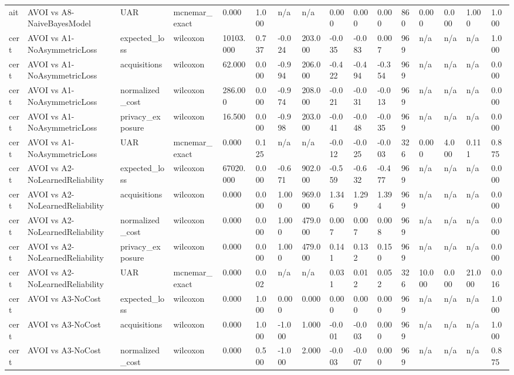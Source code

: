 \begin{table}[!ht]
{\begin{tabular}{llllllllllllllll}
ait & AVOI vs A8-NaiveBayesModel & UAR & mcnemar\_exact & 0.000 & 1.000 & n/a & n/a & 0.000 & 0.000 & 0.000 & 860 & 0.000 & 0.000 & 1.000 & 1.000 \\
cert & AVOI vs A1-NoAsymmetricLoss & expected\_loss & wilcoxon & 10103.000 & 0.737 & -0.024 & 203.000 & -0.035 & -0.083 & 0.007 & 969 & n/a & n/a & n/a & 1.000 \\
cert & AVOI vs A1-NoAsymmetricLoss & acquisitions & wilcoxon & 62.000 & 0.000 & -0.994 & 206.000 & -0.422 & -0.494 & -0.354 & 969 & n/a & n/a & n/a & 0.000 \\
cert & AVOI vs A1-NoAsymmetricLoss & normalized\_cost & wilcoxon & 286.000 & 0.000 & -0.974 & 208.000 & -0.021 & -0.031 & -0.013 & 969 & n/a & n/a & n/a & 0.000 \\
cert & AVOI vs A1-NoAsymmetricLoss & privacy\_exposure & wilcoxon & 16.500 & 0.000 & -0.998 & 203.000 & -0.041 & -0.048 & -0.035 & 969 & n/a & n/a & n/a & 0.000 \\
cert & AVOI vs A1-NoAsymmetricLoss & UAR & mcnemar\_exact & 0.000 & 0.125 & n/a & n/a & -0.012 & -0.025 & -0.003 & 326 & 0.000 & 4.000 & 0.111 & 0.875 \\
cert & AVOI vs A2-NoLearnedReliability & expected\_loss & wilcoxon & 67020.000 & 0.000 & -0.671 & 902.000 & -0.559 & -0.632 & -0.477 & 969 & n/a & n/a & n/a & 0.000 \\
cert & AVOI vs A2-NoLearnedReliability & acquisitions & wilcoxon & 0.000 & 0.000 & 1.000 & 969.000 & 1.346 & 1.299 & 1.394 & 969 & n/a & n/a & n/a & 0.000 \\
cert & AVOI vs A2-NoLearnedReliability & normalized\_cost & wilcoxon & 0.000 & 0.000 & 1.000 & 479.000 & 0.007 & 0.007 & 0.008 & 969 & n/a & n/a & n/a & 0.000 \\
cert & AVOI vs A2-NoLearnedReliability & privacy\_exposure & wilcoxon & 0.000 & 0.000 & 1.000 & 479.000 & 0.141 & 0.132 & 0.150 & 969 & n/a & n/a & n/a & 0.000 \\
cert & AVOI vs A2-NoLearnedReliability & UAR & mcnemar\_exact & 0.000 & 0.002 & n/a & n/a & 0.031 & 0.012 & 0.052 & 326 & 10.000 & 0.000 & 21.000 & 0.016 \\
cert & AVOI vs A3-NoCost & expected\_loss & wilcoxon & 0.000 & 1.000 & 0.000 & 0.000 & 0.000 & 0.000 & 0.000 & 969 & n/a & n/a & n/a & 1.000 \\
cert & AVOI vs A3-NoCost & acquisitions & wilcoxon & 0.000 & 1.000 & -1.000 & 1.000 & -0.001 & -0.003 & 0.000 & 969 & n/a & n/a & n/a & 1.000 \\
cert & AVOI vs A3-NoCost & normalized\_cost & wilcoxon & 0.000 & 0.500 & -1.000 & 2.000 & -0.003 & -0.007 & 0.000 & 969 & n/a & n/a & n/a & 0.875 \\

\end{tabular}}
\end{table}
